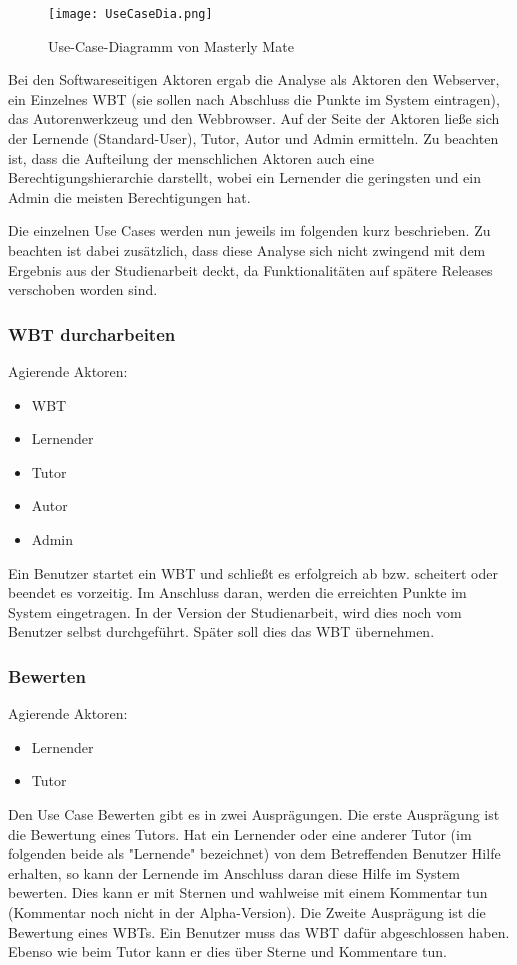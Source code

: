 \begin{figure}[ht]
\centering
\texttt{[image: UseCaseDia.png]}
\caption{Use-Case-Diagramm von Masterly Mate}\label{ref:picUseCaseDia}
\end{figure}

Bei den Softwareseitigen Aktoren ergab die Analyse als Aktoren den Webserver,
ein Einzelnes WBT (sie sollen nach Abschluss die Punkte im System eintragen),
das Autorenwerkzeug und den Webbrowser. Auf der Seite der Aktoren ließe sich der
Lernende (Standard-User), Tutor, Autor und Admin ermitteln. Zu beachten ist,
dass die Aufteilung der menschlichen Aktoren auch eine Berechtigungshierarchie
darstellt, wobei ein Lernender die geringsten und ein Admin die meisten
Berechtigungen hat.

Die einzelnen Use Cases werden nun jeweils im folgenden kurz beschrieben. Zu
beachten ist dabei zusätzlich, dass diese Analyse sich nicht zwingend mit dem
Ergebnis aus der Studienarbeit deckt, da Funktionalitäten auf spätere Releases
verschoben worden sind.

\subsubsection{WBT durcharbeiten} 
Agierende Aktoren: \begin{itemize}
  \item WBT
  \item Lernender
  \item Tutor
  \item Autor
  \item Admin 
\end{itemize}

Ein Benutzer startet ein WBT und schließt es erfolgreich ab bzw.
scheitert oder beendet es vorzeitig. Im Anschluss daran, werden die erreichten
Punkte im System eingetragen. In der Version der Studienarbeit, wird dies noch
vom Benutzer selbst durchgeführt. Später soll dies das WBT übernehmen.
\newpage
\subsubsection{Bewerten}
Agierende Aktoren: \begin{itemize}
  \item Lernender
  \item Tutor
\end{itemize} 

Den Use Case Bewerten gibt es in zwei Ausprägungen. Die erste Ausprägung ist die
Bewertung eines Tutors. Hat ein Lernender oder eine anderer Tutor (im folgenden
beide als "Lernende" bezeichnet) von dem Betreffenden Benutzer Hilfe erhalten,
so kann der Lernende im Anschluss daran diese Hilfe im System bewerten.
Dies kann er mit Sternen und wahlweise mit einem Kommentar tun (Kommentar noch
nicht in der Alpha-Version). Die Zweite Ausprägung ist die Bewertung eines WBTs.
Ein Benutzer muss das WBT dafür abgeschlossen haben. Ebenso wie beim Tutor kann
er dies über Sterne und Kommentare tun.
	
